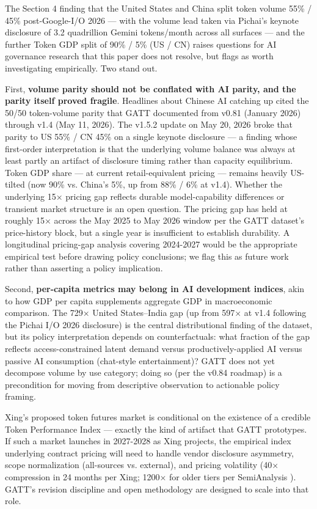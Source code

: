 \documentclass[11pt,a4paper]{article}
\begin{document}
The Section 4 finding that the United States and China split token volume 55\% / 45\% post-Google-I/O 2026 --- with the volume lead taken via Pichai's keynote disclosure \cite{pichai2026io} of 3.2 quadrillion Gemini tokens/month across all surfaces --- and the further Token GDP split of 90\% / 5\% (US / CN) raises questions for AI governance research that this paper does not resolve, but flags as worth investigating empirically. Two stand out.

First, \textbf{volume parity should not be conflated with AI parity, and the parity itself proved fragile}. Headlines about Chinese AI catching up cited the 50/50 token-volume parity that GATT documented from v0.81 (January 2026) through v1.4 (May 11, 2026). The v1.5.2 update on May 20, 2026 broke that parity to US 55\% / CN 45\% on a single keynote disclosure --- a finding whose first-order interpretation is that the underlying volume balance was always at least partly an artifact of disclosure timing rather than capacity equilibrium. Token GDP share --- at current retail-equivalent pricing --- remains heavily US-tilted (now 90\% vs. China's 5\%, up from 88\% / 6\% at v1.4). Whether the underlying 15× pricing gap reflects durable model-capability differences or transient market structure is an open question. The pricing gap has held at roughly 15× across the May 2025 to May 2026 window per the GATT dataset's price-history block, but a single year is insufficient to establish durability. A longitudinal pricing-gap analysis covering 2024-2027 would be the appropriate empirical test before drawing policy conclusions; we flag this as future work rather than asserting a policy implication.

Second, \textbf{per-capita metrics may belong in AI development indices}, akin to how GDP per capita supplements aggregate GDP in macroeconomic comparison. The 729× United States–India gap (up from 597× at v1.4 following the Pichai I/O 2026 disclosure) is the central distributional finding of the dataset, but its policy interpretation depends on counterfactuals: what fraction of the gap reflects access-constrained latent demand versus productively-applied AI versus passive AI consumption (chat-style entertainment)? GATT does not yet decompose volume by use category; doing so (per the v0.84 roadmap) is a precondition for moving from descriptive observation to actionable policy framing.

Xing's \cite{xing2026token} proposed token futures market is conditional on the existence of a credible Token Performance Index --- exactly the kind of artifact that GATT prototypes. If such a market launches in 2027-2028 as Xing projects, the empirical index underlying contract pricing will need to handle vendor disclosure asymmetry, scope normalization (all-sources vs. external), and pricing volatility (40× compression in 24 months per Xing; 1200× for older tiers per SemiAnalysis \cite{patel2026semianalysis}). GATT's revision discipline and open methodology are designed to scale into that role.
\end{document}
